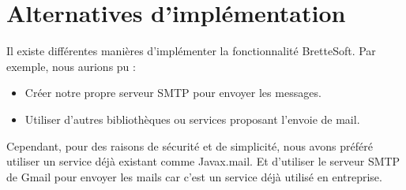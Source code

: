 \section{Alternatives d'implémentation}

Il existe différentes manières d'implémenter la fonctionnalité BretteSoft.
Par exemple, nous aurions pu :

\begin{itemize}
    \item Créer notre propre serveur SMTP pour envoyer les messages.
    \item Utiliser d'autres bibliothèques ou services proposant l'envoie de mail.
\end{itemize}

Cependant, pour des raisons de sécurité et de simplicité, nous avons préféré utiliser un service déjà existant comme Javax.mail.
Et d'utiliser le serveur SMTP de Gmail pour envoyer les mails car c'est un service déjà utilisé en entreprise.

